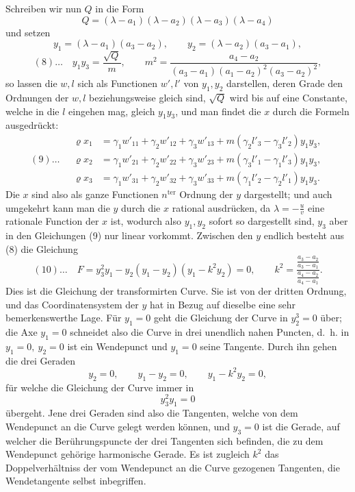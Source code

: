\documentclass[10pt]{article}
\begin{document}
Schreiben wir nun \(Q\) in die Form
\[
Q=(\lambda-a_1)(\lambda-a_2)(\lambda-a_3)(\lambda-a_4)
\]
und setzen
\[
y_1=(\lambda-a_1)(a_3-a_2),\qquad
y_2=(\lambda-a_2)(a_3-a_1),
\]
\[
(8)\ldots\quad y_1y_3=\frac{\sqrt Q}{m},\qquad
m^2=\frac{a_4-a_2}{(a_3-a_1)(a_1-a_2)^2(a_3-a_2)^2},
\]
so lassen die \(w,l\) sich als Functionen \(w',l'\) von \(y_1,y_2\) darstellen, deren Grade den Ordnungen der \(w,l\) beziehungsweise gleich sind, \(\sqrt Q\) wird bis auf eine Constante, welche in die \(l\) eingehen mag, gleich \(y_1y_3\), und man findet die \(x\) durch die Formeln ausgedrückt:
\[
(9)\ldots\quad
\begin{aligned}
\varrho x_1&=\gamma_1w'_{11}+\gamma_2w'_{12}+\gamma_3w'_{13}
+m(\gamma_2l'_3-\gamma_3l'_2)y_1y_3,\\
\varrho x_2&=\gamma_1w'_{21}+\gamma_2w'_{22}+\gamma_3w'_{23}
+m(\gamma_3l'_1-\gamma_1l'_3)y_1y_3,\\
\varrho x_3&=\gamma_1w'_{31}+\gamma_2w'_{32}+\gamma_3w'_{33}
+m(\gamma_1l'_2-\gamma_2l'_1)y_1y_3.
\end{aligned}
\]
Die \(x\) sind also als ganze Functionen \(n^{\text{ter}}\) Ordnung der \(y\) dargestellt; und auch umgekehrt kann man die \(y\) durch die \(x\) rational ausdrücken, da \(\lambda=-\frac{u}{v}\) eine rationale Function der \(x\) ist, wodurch also \(y_1,y_2\) sofort so dargestellt sind, \(y_3\) aber in den Gleichungen (9) nur linear vorkommt. Zwischen den \(y\) endlich besteht aus (8) die Gleichung
\[
(10)\ldots\quad
F=y_3^2y_1-y_2(y_1-y_2)(y_1-k^2y_2)=0,\qquad
k^2=\frac{\frac{a_3-a_2}{a_3-a_1}}{\frac{a_4-a_2}{a_4-a_1}}.
\]
Dies ist die Gleichung der transformirten Curve. Sie ist von der dritten Ordnung, und das Coordinatensystem der \(y\) hat in Bezug auf dieselbe eine sehr bemerkenswerthe Lage. Für \(y_1=0\) geht die Gleichung der Curve in \(y_2^3=0\) über; die Axe \(y_1=0\) schneidet also die Curve in drei unendlich nahen Puncten, d.\ h. in \(y_1=0,\ y_2=0\) ist ein Wendepunct und \(y_1=0\) seine Tangente. Durch ihn gehen die drei Geraden
\[
y_2=0,\qquad y_1-y_2=0,\qquad y_1-k^2y_2=0,
\]
für welche die Gleichung der Curve immer in
\[
y_3^2y_1=0
\]
übergeht. Jene drei Geraden sind also die Tangenten, welche von dem Wendepunct an die Curve gelegt werden können, und \(y_3=0\) ist die Gerade, auf welcher die Berührungspuncte der drei Tangenten sich befinden, die zu dem Wendepunct gehörige harmonische Gerade. Es ist zugleich \(k^2\) das Doppelverhältniss der vom Wendepunct an die Curve gezogenen Tangenten, die Wendetangente selbst inbegriffen.
\end{document}
